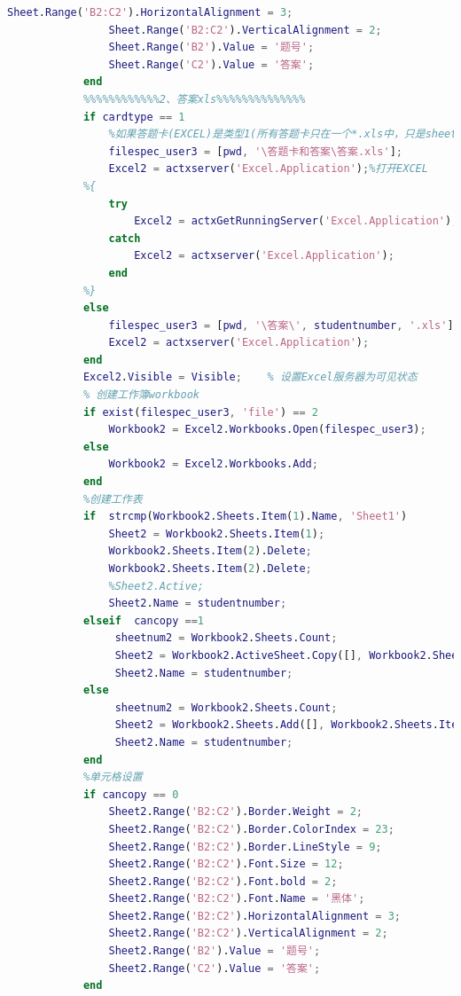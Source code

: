 \begin{lstlisting}[language=Matlab]
                Sheet.Range('B2:C2').HorizontalAlignment = 3;
                Sheet.Range('B2:C2').VerticalAlignment = 2;
                Sheet.Range('B2').Value = '题号';
                Sheet.Range('C2').Value = '答案';
            end
            %%%%%%%%%%%%2、答案xls%%%%%%%%%%%%%%
            if cardtype == 1
                %如果答题卡(EXCEL)是类型1(所有答题卡只在一个*.xls中，只是sheet的名称为学号)
                filespec_user3 = [pwd, '\答题卡和答案\答案.xls'];
                Excel2 = actxserver('Excel.Application');%打开EXCEL
            %{
                try
                    Excel2 = actxGetRunningServer('Excel.Application');
                catch
                    Excel2 = actxserver('Excel.Application');
                end
            %}
            else
                filespec_user3 = [pwd, '\答案\', studentnumber, '.xls'];
                Excel2 = actxserver('Excel.Application');
            end
            Excel2.Visible = Visible;    % 设置Excel服务器为可见状态
            % 创建工作簿workbook
            if exist(filespec_user3, 'file') == 2
                Workbook2 = Excel2.Workbooks.Open(filespec_user3);
            else
                Workbook2 = Excel2.Workbooks.Add;
            end
            %创建工作表
            if  strcmp(Workbook2.Sheets.Item(1).Name, 'Sheet1')
                Sheet2 = Workbook2.Sheets.Item(1);
                Workbook2.Sheets.Item(2).Delete;
                Workbook2.Sheets.Item(2).Delete;
                %Sheet2.Active;
                Sheet2.Name = studentnumber;
            elseif  cancopy ==1
                 sheetnum2 = Workbook2.Sheets.Count;
                 Sheet2 = Workbook2.ActiveSheet.Copy([], Workbook2.Sheets.Item(sheetnum2));
                 Sheet2.Name = studentnumber;
            else
                 sheetnum2 = Workbook2.Sheets.Count;
                 Sheet2 = Workbook2.Sheets.Add([], Workbook2.Sheets.Item(sheetnum2), 1, []);
                 Sheet2.Name = studentnumber;
            end
            %单元格设置
            if cancopy == 0
                Sheet2.Range('B2:C2').Border.Weight = 2;
                Sheet2.Range('B2:C2').Border.ColorIndex = 23;
                Sheet2.Range('B2:C2').Border.LineStyle = 9;
                Sheet2.Range('B2:C2').Font.Size = 12;
                Sheet2.Range('B2:C2').Font.bold = 2;
                Sheet2.Range('B2:C2').Font.Name = '黑体';
                Sheet2.Range('B2:C2').HorizontalAlignment = 3;
                Sheet2.Range('B2:C2').VerticalAlignment = 2;
                Sheet2.Range('B2').Value = '题号';
                Sheet2.Range('C2').Value = '答案';
            end
            \end{lstlisting}
